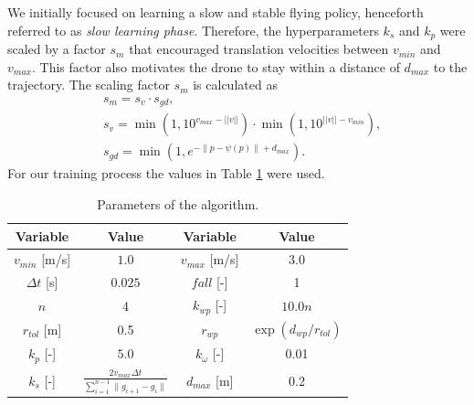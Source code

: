 We initially focused on learning a slow and stable flying policy, henceforth referred to as \textit{slow learning phase}. Therefore, the hyperparameters $k_s$ and $k_p$ were scaled by a factor $s_m$ that encouraged translation velocities between $v_{min}$ and $v_{max}$. This factor also motivates the drone to stay within a distance of $d_{max}$ to the trajectory. The scaling factor $s_m$ is calculated as
\begin{align*}
 & s_m = s_{v} \cdot s_{gd}, \\
 & s_{v} = \min(1, 10^{v_{max}-||v||}) \cdot \min(1, 10^{||v||-v_{min}}), \\
 & s_{gd} = \min(1,e^{ - \|p - \psi(p) \| + d_{max}}).
\end{align*}
For our training process the values in Table \ref{table:parameters} were used.
\begin{table}[h]
\centering
\caption{Parameters of the algorithm.}
\begin{tabular}{c c|c c} 
 \hline 
 Variable & Value & Variable & Value \\ [0.1ex] 
 \hline
 \hline
 $v_{min}$ [m/s] & $1.0$ & $v_{max}$ [m/s] & $3.0 $ \\ [0.2ex]
 $\Delta t$ [s] & $0.025$ & $fall$ [-] & 1 \\ [0.2ex]
 $n$ & 4 & $k_{wp}$ [-] & $10.0 n$ \\ [0.2ex]
 $r_{tol}$ [m] & 0.5& $r_{wp}$ & $\exp(d_{wp}/r_{tol})$ \\ [0.2ex]
 $k_p$ [-] & $5.0$ & $k_\omega$ [-] & 0.01 \\ [0.2ex] 
 $k_s$ [-] & $\frac{2v_{max}\Delta t}{\sum_{i=1}^{n-1} \|g_{i+1} -g_i\|}$ & $d_{max}$ [m] & 0.2 \\[2ex] 
 \hline
\end{tabular}
\label{table:parameters}
\end{table}
